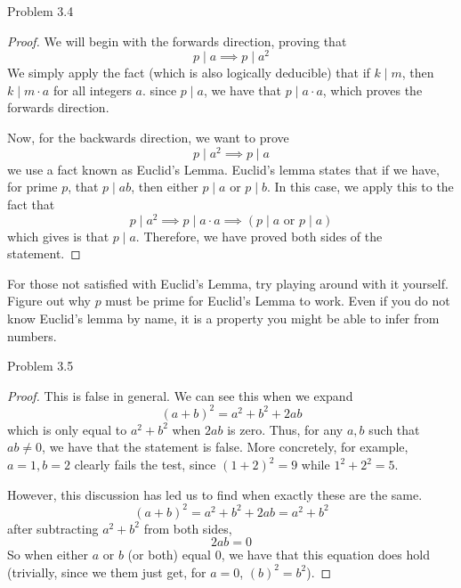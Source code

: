 \begin{sol}{Problem 3.4}
\begin{proof}
We will begin with the forwards direction, proving that 
\[
p \mid a \implies p \mid a^2
\]
We simply apply the fact (which is also logically deducible) that if $k \mid m$, then $k \mid m \cdot a$ for all integers $a$. since $p \mid a$, we have that $p \mid a \cdot a$, which proves the forwards direction. 

Now, for the backwards direction, we want to prove
\[
p \mid a^2 \implies p \mid a
\]
we use a fact known as Euclid's Lemma. Euclid's lemma states that if we have, for prime $p$, that $p \mid ab$, then either $p \mid a$ or $p \mid b$. In this case, we apply this to the fact that 
\[
p \mid a^2 \implies p \mid a \cdot a \implies (p \mid a \text{ or } p \mid a)
\]
which gives is that $p \mid a$. Therefore, we have proved both sides of the statement.
\end{proof}

For those not satisfied with Euclid's Lemma, try playing around with it yourself. Figure out why $p$ must be prime for Euclid's Lemma to work. Even if you do not know Euclid's lemma by name, it is a property you might be able to infer from numbers. 
\end{sol}

\begin{sol}{Problem 3.5}
\begin{proof}
This is false in general. We can see this when we expand
\[
(a + b)^2 = a^2 + b^2 + 2ab
\]
which is only equal to $a^2 + b^2$ when $2ab$ is zero. Thus, for any $a, b$ such that $ab \neq 0$, we have that the statement is false. More concretely, for example, $a = 1, b = 2$ clearly fails the test, since $(1 + 2)^2 = 9$ while $1^2 + 2^2 = 5$. 

However, this discussion has led us to find when exactly these are the same.
\[
(a + b)^2 = a^2 + b^2 + 2ab = a^2 + b^2
\]
after subtracting $a^2 + b^2$ from both sides,
\[
2ab = 0
\]
So when either $a$ or $b$ (or both) equal 0, we have that this equation does hold (trivially, since we them just get, for $a = 0$, $(b)^2 = b^2$).
\end{proof}
\end{sol}

